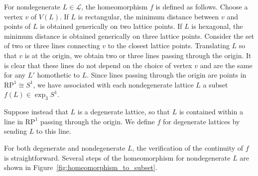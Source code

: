\documentclass[12pt,twoside]{reedthesis}
\theoremstyle{definition}
\newcommand{\LS}{\mathcal{L}}
\newcommand{\RP}{\mathrm{RP}^1}
\begin{document}
For nondegenerate $L \in \LS$, the homeomorphism $f$ is defined as follows.
Choose a vertex $v$ of $V(L)$.
If $L$ is rectangular, the minimum distance between $v$ and points of $L$ is obtained generically on two lattice points.
If $L$ is hexagonal, the minimum distance is obtained generically on three lattice points.
Consider the set of two or three lines connecting $v$ to the closest lattice points.
Translating $L$ so that $v$ is at the origin, we obtain two or three lines passing through the origin.
It is clear that these lines do not depend on the choice of vertex $v$ and are the same for any $L'$ homothetic to $L$.
Since lines passing through the origin are points in $\RP \cong S^1$, we have associated with each nondegenerate lattice $L$ a subset $f(L) \in \exp_3 S^1$.

Suppose instead that $L$ is a degenerate lattice, so that $L$ is contained within a line in $\RP$ passing through the origin.
We define $f$ for degenerate lattices by sending $L$ to this line.

For both degenerate and nondegenerate $L$, the verification of the continuity of $f$ is straightforward.
Several steps of the homeomorphism for nondegenerate $L$ are shown in Figure~\ref{fig:homeomorphism_to_subset}.
\end{document}
